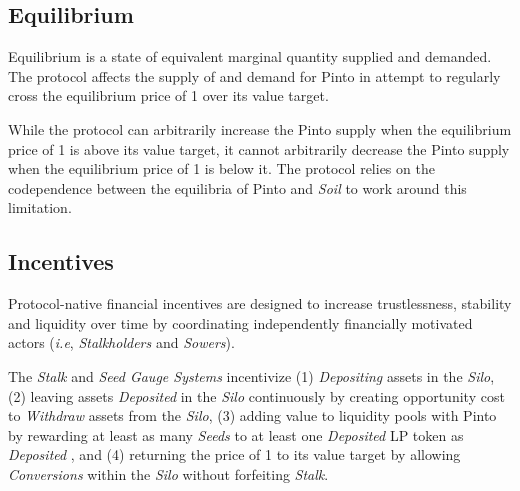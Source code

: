 \documentclass[tikz]{article}
\newcommand{\term}[1]{\textsl{#1}}
\newcommand{\Pinto}{} %
\begin{document}

\subsection{Equilibrium}
\vspace{-0.15cm}

Equilibrium is a state of equivalent marginal quantity supplied and demanded. The protocol affects the supply of and demand for Pinto in attempt to regularly cross the equilibrium price of \Pinto1 over its value target. 

\vspace{-0.15cm}

While the protocol can arbitrarily increase the Pinto supply when the equilibrium price of \Pinto1 is above its value target, it cannot arbitrarily decrease the Pinto supply when the equilibrium price of \Pinto1 is below it. The protocol relies on the codependence between the equilibria of Pinto and \term{Soil} to work around this limitation. 


\vspace{-0.15cm}
\subsection{Incentives}
\vspace{-0.15cm}

Protocol-native financial incentives are designed to increase trustlessness, stability and liquidity over time by coordinating independently financially motivated actors (\textit{i.e}, \term{Stalkholders} and \term{Sowers}). 

\vspace{-0.15cm}

The \term{Stalk} and \term{Seed Gauge Systems} incentivize (1) \term{Depositing} assets in the \term{Silo}, (2) leaving assets \term{Deposited} in the \term{Silo} continuously by creating opportunity cost to \term{Withdraw} assets from the \term{Silo}, (3) adding value to liquidity pools with Pinto by rewarding at least as many \term{Seeds} to at least one \term{Deposited} LP token as \term{Deposited} \Pinto, and (4) returning the price of \Pinto1 to its value target by allowing \term{Conversions} within the \term{Silo} without forfeiting \term{Stalk}.

\vspace{-0.15cm}
\end{document}
